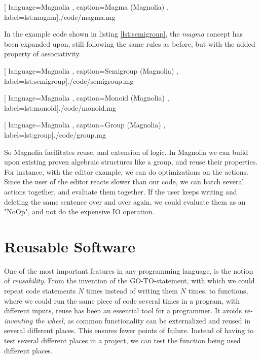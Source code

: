 \begin{center}
  
    [ language=Magnolia
    , caption={Magma (Magnolia)}
    , label=lst:magma]{./code/magma.mg}
\end{center}

In the example code shown in listing \ref{lst:semigroup}, the \textit{magma}
concept has been expanded upon, still following the same rules as before, but
with the added property of associativity.

\begin{center}
  
    [ language=Magnolia
    , caption={Semigroup (Magnolia)}
    , label=lst:semigroup]{./code/semigroup.mg}
\end{center}

\begin{center}
  
    [ language=Magnolia
    , caption={Monoid (Magnolia)}
    , label=lst:monoid]{./code/monoid.mg}
\end{center}

\begin{center}
  
    [ language=Magnolia
    , caption={Group (Magnolia)}
    , label=lst:group]{./code/group.mg}
\end{center}

So Magnolia facilitates reuse, and extension of logic. In Magnolia we can build
upon existing proven algebraic structures like a group, and reuse their
properties. For instance, with the editor example, we can do optimizations on
the actions. Since the user of the editor reacts slower than our code, we can
batch several actions together, and evaluate them together. If the user keeps
writing and deleting the same sentence over and over again, we could evaluate
them as an "NoOp", and not do the expensive IO operation.

\section{Reusable Software}

One of the most important features in any programming language, is the notion
of \textit{reusability}. From the invention of the GO-TO-statement, with which
we could repeat code statements $N$ times instead of writing them $N$ times, to
functions, where we could run the same piece of code several times in a
program, with different inputs, reuse has been an essential tool for a
programmer. It avoids \textit{re-inventing the wheel}, as common functionality
can be externalized and reused in several different places. This ensures
fewer points of failure. Instead of having to test several different places in
a project, we can test the function being used different places.


